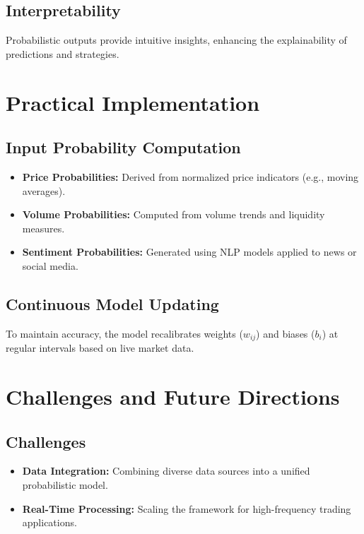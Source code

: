 \documentclass[a4]{article}
\begin{document}
\subsection{Interpretability}
Probabilistic outputs provide intuitive insights, enhancing the explainability of predictions and strategies.

\section{Practical Implementation}

\subsection{Input Probability Computation}

\begin{itemize}
\item  {\bf Price Probabilities:}  Derived from normalized price indicators (e.g., moving averages).
\item {\bf Volume Probabilities:}  Computed from volume trends and liquidity measures.
\item  {\bf Sentiment Probabilities:}  Generated using NLP models applied to news or social media.
\end{itemize}

\subsection{Continuous Model Updating}
To maintain accuracy, the model recalibrates weights ($w_{ij}$) and biases ($b_i$) at regular intervals based on live market data.

\section{Challenges and Future Directions}

\subsection{Challenges}

\begin{itemize}
\item  {\bf Data Integration:}  Combining diverse data sources into a unified probabilistic model.
\item {\bf Real-Time Processing:}  Scaling the framework for high-frequency trading applications.
\end{itemize}
\end{document}
